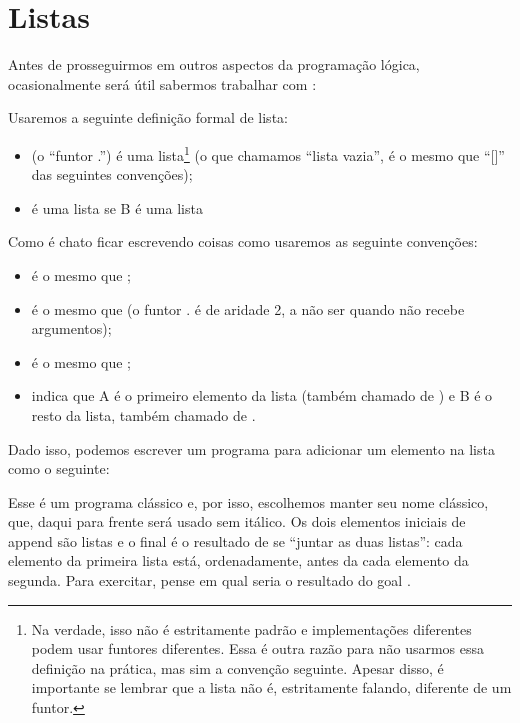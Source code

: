 \documentclass{article}
\begin{document}
\section{Listas}

Antes de prosseguirmos em outros aspectos da programação lógica, ocasionalmente será útil sabermos trabalhar com :

\begin{definition}
  Usaremos a seguinte definição formal de lista:
  \begin{itemize}
    \item {} (o ``funtor .'') é uma lista\footnote{Na verdade, isso não é estritamente padrão e implementações diferentes podem usar funtores diferentes. Essa é outra razão para não usarmos essa definição na prática, mas sim a convenção seguinte. Apesar disso, é importante se lembrar que a lista não é, estritamente falando, diferente de um funtor.} (o que chamamos ``lista vazia'', é o mesmo que ``[]'' das seguintes convenções);
    \item {} é uma lista se B é uma lista
  \end{itemize}
  Como é chato ficar escrevendo coisas como  usaremos as seguinte convenções:
  \begin{itemize}
    \item \codigo{[A,B]} é o mesmo que ;
    \item \codigo{[A]} é o mesmo que  (o funtor . é de aridade 2, a não ser quando não recebe argumentos);
    \item \codigo{[A, B, C, ...]} é o mesmo que ;
    \item \codigo{[A|B]} indica que A é o primeiro elemento da lista (também chamado de ) e B é o resto da lista, também chamado de  .
  \end{itemize}
\end{definition}

Dado isso, podemos escrever um programa para adicionar um elemento na lista como o seguinte:

\label{lst:append}

Esse é um programa clássico e, por isso, escolhemos manter seu nome clássico, que, daqui para frente será usado sem itálico. Os dois elementos iniciais de append são listas e o final é o resultado de se ``juntar as duas listas'': cada elemento da primeira lista está, ordenadamente, antes da cada elemento da segunda. Para exercitar, pense em qual seria o resultado do goal .
\end{document}
